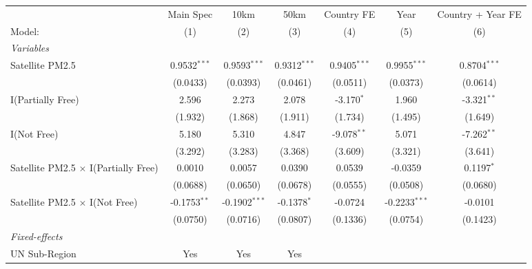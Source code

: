 
\begingroup
\centering
\begin{tabular}{lcccccc}
   \tabularnewline \midrule \midrule
                                               & Main Spec      & 10km            & 50km           & Country FE     & Year            & Country + Year FE \\   
   Model:                                      & (1)            & (2)             & (3)            & (4)            & (5)             & (6)\\  
   \midrule
   \emph{Variables}\\
   Satellite PM2.5                             & 0.9532$^{***}$ & 0.9593$^{***}$  & 0.9312$^{***}$ & 0.9405$^{***}$ & 0.9955$^{***}$  & 0.8704$^{***}$\\   
                                               & (0.0433)       & (0.0393)        & (0.0461)       & (0.0511)       & (0.0373)        & (0.0614)\\   
   I(Partially Free)                           & 2.596          & 2.273           & 2.078          & -3.170$^{*}$   & 1.960           & -3.321$^{**}$\\   
                                               & (1.932)        & (1.868)         & (1.911)        & (1.734)        & (1.495)         & (1.649)\\   
   I(Not Free)                                 & 5.180          & 5.310           & 4.847          & -9.078$^{**}$  & 5.071           & -7.262$^{**}$\\   
                                               & (3.292)        & (3.283)         & (3.368)        & (3.609)        & (3.321)         & (3.641)\\   
   Satellite PM2.5 $\times$ I(Partially Free)  & 0.0010         & 0.0057          & 0.0390         & 0.0539         & -0.0359         & 0.1197$^{*}$\\   
                                               & (0.0688)       & (0.0650)        & (0.0678)       & (0.0555)       & (0.0508)        & (0.0680)\\   
   Satellite PM2.5 $\times$ I(Not Free)        & -0.1753$^{**}$ & -0.1902$^{***}$ & -0.1378$^{*}$  & -0.0724        & -0.2233$^{***}$ & -0.0101\\   
                                               & (0.0750)       & (0.0716)        & (0.0807)       & (0.1336)       & (0.0754)        & (0.1423)\\   
   \midrule
   \emph{Fixed-effects}\\
   UN Sub-Region                               & Yes            & Yes             & Yes            &                &                 & \\  

\end{tabular}
